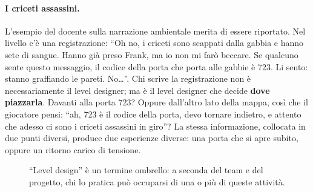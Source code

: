 \paragraph{I criceti assassini.} L'esempio del docente sulla narrazione
ambientale merita di essere riportato. Nel livello c'è una registrazione:
``Oh no, i criceti sono scappati dalla gabbia e hanno sete di sangue. Hanno
già preso Frank, ma io non mi farò beccare. Se qualcuno sente questo
messaggio, il codice della porta che porta alle gabbie è 723. Li sento: stanno
graffiando le pareti. No\dots''. Chi scrive la registrazione non è
necessariamente il level designer; ma è il level designer che decide
\textbf{dove piazzarla}. Davanti alla porta 723? Oppure dall'altro lato della
mappa, così che il giocatore pensi: ``ah, 723 è il codice della porta, devo
tornare indietro, e attento che adesso ci sono i criceti assassini in giro''?
La stessa informazione, collocata in due punti diversi, produce due
esperienze diverse: una porta che si apre subito, oppure un ritorno carico di
tensione.

\begin{figure}[htbp]
\centering
{}
\caption{``Level design'' è un termine ombrello: a seconda del team e del
progetto, chi lo pratica può occuparsi di una o più di queste attività.}
\label{gd8:fig:ombrello}
\end{figure}

